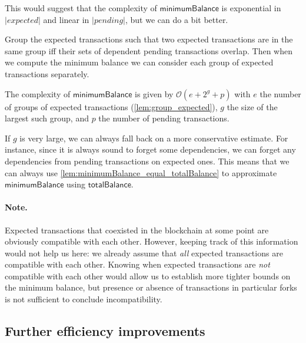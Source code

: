 \documentclass{article}
\newcommand{\order}[1]{\mathcal{O}\left(#1\right)}
\theoremstyle{definition}{
  \newtheorem{lemma}{Lemma}[section] %
  \newtheorem{definition}[lemma]{Definition}
}
\theoremstyle{theorem}{
  \newtheorem{invariant}[lemma]{Invariant}
  \newtheorem{proofobligation}[lemma]{Proof Obligation}
}
\numberwithin{equation}{lemma}
\begin{document}
This would suggest that the complexity of $\mathsf{minimumBalance}$ is
exponential in $|\mathit{expected}|$ and linear in $|\mathit{pending}|$,
but we can do a bit better.

\begin{lemma}
Group the expected transactions such that two expected transactions are in
the same group iff their sets of dependent pending transactions overlap.
Then when we compute the minimum balance we can consider each group of
expected transactions separately.
\label{lem:group_expected}
\end{lemma}

\begin{lemma}
The complexity of $\mathsf{minimumBalance}$ is given by
\begin{math}
\order{e + 2^g + p}
\end{math}
with $e$ the number of groups of expected transactions
(\cref{lem:group_expected}), $g$ the size of the largest such group,
and $p$ the number of pending transactions.
\label{lem:complexity_minimize}
\end{lemma}

If $g$ is very large, we can always fall back on a more conservative estimate.
For instance, since it is always sound to forget some dependencies, we can
forget any dependencies from pending transactions on expected ones. This means
that we can always use \cref{lem:minimumBalance_equal_totalBalance} to
approximate $\mathsf{minimumBalance}$ using $\mathsf{totalBalance}$.

\paragraph{Note.}
Expected transactions that coexisted in the blockchain at some point are
obviously compatible with each other. However, keeping track of this information
would not help us here: we already assume that \emph{all} expected transactions
are compatible with each other. Knowing when expected transactions are
\emph{not} compatible with each other would allow us to establish more tighter
bounds on the minimum balance, but presence or absence of transactions in
particular forks is not sufficient to conclude incompatibility.

\subsection{Further efficiency improvements}
\end{document}
